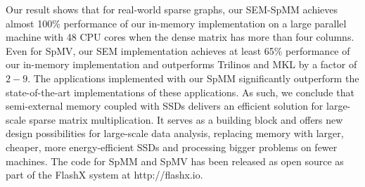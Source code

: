 Our result shows that for real-world sparse graphs, our SEM-SpMM achieves almost
100\% performance of our in-memory implementation on a large parallel machine
with 48 CPU cores when the dense matrix has more than four columns. Even for
SpMV, our SEM implementation achieves at least 65\% performance of our in-memory
implementation and outperforms Trilinos \cite{trilinos} and MKL \cite{mkl} by
a factor of $2-9$. The applications implemented with our SpMM significantly
outperform the state-of-the-art implementations of these applications. As such,
we conclude that semi-external memory coupled with SSDs delivers an efficient
solution for large-scale sparse matrix multiplication. It serves
as a building block and offers new design possibilities for large-scale
data analysis, replacing memory with larger, cheaper, more energy-efficient SSDs
and processing bigger problems on fewer machines. The code for SpMM and SpMV has been 
released as open source as part of the FlashX system at http://flashx.io.
